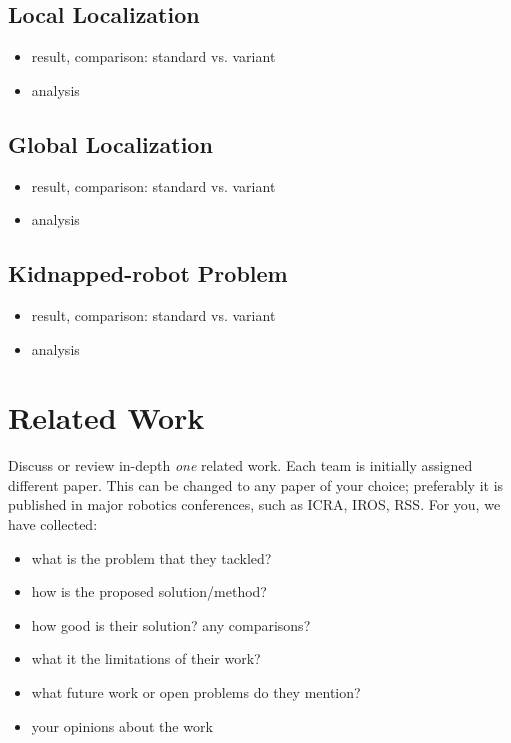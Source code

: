 \documentclass[letterpaper, 10 pt, conference]{ieeeconf}  %
\begin{document}
\subsection{Local Localization}
\begin{itemize}
\item result, comparison: standard vs. variant
\item analysis
\end{itemize}

\subsection{Global Localization}
\begin{itemize}
\item result, comparison: standard vs. variant
\item analysis
\end{itemize}

\subsection{Kidnapped-robot Problem}
\begin{itemize}
\item result, comparison: standard vs. variant
\item analysis
\end{itemize}

\section{Related Work}
Discuss or review in-depth \emph{one} related work.
Each team is initially assigned different paper.
This can be changed to any paper of your choice; preferably it is published in major robotics conferences, such as ICRA, IROS, RSS.
For you, we have collected: \cite{1389783, 5354298, 5509950, 6696380, 6094843, 4059089}
\begin{itemize}
    \item what is the problem that they tackled?
    \item how is the proposed solution/method?
    \item how good is their solution? any comparisons?
    \item what it the limitations of their work?
    \item what future work or open problems do they mention?
    \item your opinions about the work
\end{itemize}
\end{document}

